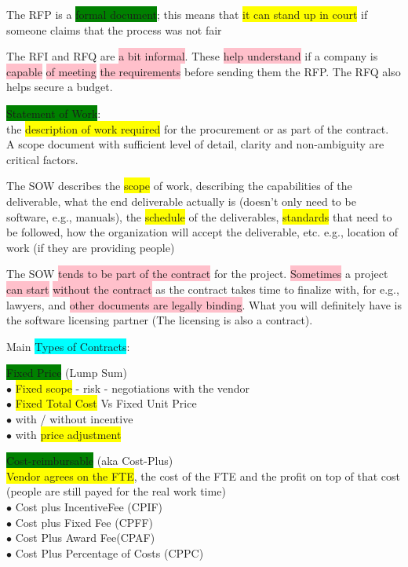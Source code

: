\documentclass[]{project_plan}
\newcommand{\bulletPoint}{\hspace{-3.1pt}$\bullet$ \hspace{5pt}}
\begin{document}
The RFP is a \colorbox{green}{formal document}; this means that \colorbox{yellow}{it can stand up in court} if someone claims that the process was not fair

The RFI and RFQ are \colorbox{pink}{a bit informal}. These \colorbox{pink}{help understand} if a company is \colorbox{pink}{capable}
\colorbox{pink}{of meeting} \colorbox{pink}{the requirements} before sending them the RFP. The RFQ also
helps secure a budget.

\colorbox{green}{Statement of Work}:\\
the \colorbox{yellow}{description of work required} for the procurement or as part of the contract.\\
A scope document with sufficient level of detail, clarity and non-ambiguity are
critical factors.

The SOW describes the \colorbox{yellow}{scope} of work, describing the capabilities of the
deliverable, what the end deliverable actually is (doesn't only need
to be software, e.g., manuals), the \colorbox{yellow}{schedule} of the
deliverables, \colorbox{yellow}{standards} that need to be followed,
how the organization will accept the deliverable, etc. e.g., location of
work (if they are providing people)

The SOW \colorbox{pink}{tends to be part of the contract} for the project.
\colorbox{pink}{Sometimes} a project \colorbox{pink}{can start} \colorbox{pink}{without the contract} as the contract takes
time to finalize with, for e.g., lawyers, and \colorbox{pink}{other documents are legally
  binding}. What you will definitely have is the software licensing partner
(The licensing is also a contract).

\newpage

Main \colorbox{cyan}{Types of Contracts}:

\colorbox{green}{Fixed Price} (Lump Sum)\\
\bulletPoint \colorbox{yellow}{Fixed scope} - risk - negotiations with the vendor\\
\bulletPoint \colorbox{yellow}{Fixed Total Cost} Vs Fixed Unit Price\\
\bulletPoint with / without incentive\\
\bulletPoint with \colorbox{yellow}{price adjustment}

\colorbox{green}{Cost-reimbursable} (aka Cost-Plus)\\
\colorbox{yellow}{Vendor agrees on the FTE}, the cost of the FTE and the profit on top of that cost (people are still payed for the real work time)\\
\bulletPoint Cost plus IncentiveFee (CPIF)\\
\bulletPoint Cost plus Fixed Fee (CPFF)\\
\bulletPoint Cost Plus Award Fee(CPAF)\\
\bulletPoint Cost Plus Percentage of Costs (CPPC)
\end{document}
